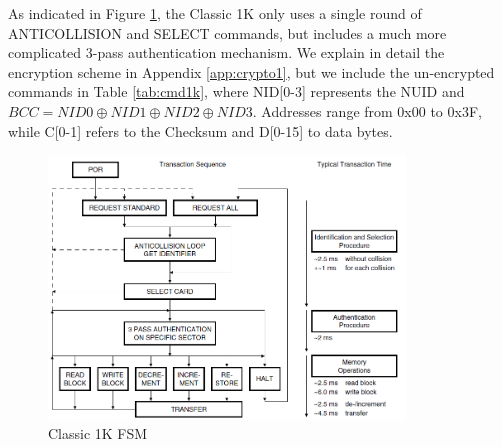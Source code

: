 \documentclass[fleqn,10pt]{SelfArx} %
\begin{document}
\noindent As indicated in Figure \ref{fig:fsm1k}, the Classic 1K only uses a single round of ANTICOLLISION and SELECT commands, but includes a much more complicated 3-pass authentication mechanism. We explain in detail the encryption scheme in Appendix \ref{app:crypto1}, but we include the un-encrypted commands in Table \ref{tab:cmd1k}, where NID[0-3] represents the NUID and $BCC=NID0 \oplus NID1 \oplus NID2 \oplus NID3$. Addresses range from 0x00 to 0x3F, while C[0-1] refers to the Checksum and D[0-15] to data bytes.

\begin{figure}[ht]
 \hfill
  \includegraphics[height=7cm,keepaspectratio]{img/fsm1k.png}
 \hspace*{\fill}
  \caption{Classic 1K FSM}
  \label{fig:fsm1k}
\end{figure}
\end{document}
